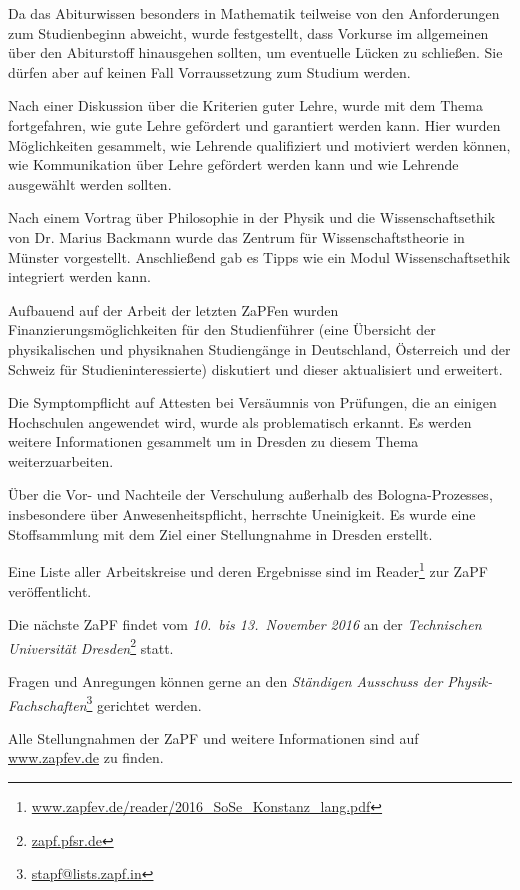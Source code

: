 Da das Abiturwissen besonders in Mathematik teilweise von den Anforderungen 
zum Studienbeginn abweicht, wurde festgestellt, dass Vorkurse im allgemeinen 
über den Abiturstoff hinausgehen sollten, um eventuelle Lücken zu schließen. 
Sie dürfen aber auf keinen Fall Vorraussetzung zum Studium werden.

Nach einer Diskussion über die Kriterien guter Lehre, wurde mit dem 
Thema fortgefahren, wie gute Lehre gefördert und garantiert werden kann. 
Hier wurden Möglichkeiten gesammelt, wie Lehrende qualifiziert und motiviert werden können, 
wie Kommunikation über Lehre gefördert werden kann und wie Lehrende ausgewählt werden sollten.

Nach einem Vortrag über Philosophie in der Physik und die Wissenschaftsethik von Dr. Marius
Backmann wurde das Zentrum für Wissenschaftstheorie in Münster
vorgestellt. Anschließend gab es Tipps wie ein Modul Wissenschaftsethik integriert werden kann.

Aufbauend auf der Arbeit der letzten ZaPFen wurden Finanzierungsmöglichkeiten für den 
Studienführer (eine Übersicht der physikalischen und physiknahen Studiengänge in 
Deutschland, Österreich und der Schweiz für Studieninteressierte) diskutiert und dieser aktualisiert und erweitert.

Die Symptompflicht auf Attesten bei Versäumnis von Prüfungen, die an einigen Hochschulen 
angewendet wird, wurde als problematisch erkannt. Es werden weitere Informationen gesammelt um in Dresden zu diesem Thema weiterzuarbeiten.

Über die Vor- und Nachteile der Verschulung außerhalb des Bologna-Prozesses, 
insbesondere über Anwesenheitspflicht, herrschte Uneinigkeit. 
Es wurde eine Stoffsammlung mit dem Ziel einer Stellungnahme in Dresden erstellt.

Eine Liste aller Arbeitskreise und deren Ergebnisse sind im
Reader\footnote{\href{http://www.zapfev.de/reader/2016_SoSe_Konstanz_lang.pdf}{\url{www.zapfev.de/reader/2016_SoSe_Konstanz_lang.pdf}}}
zur ZaPF veröffentlicht.

\vfill

Die nächste ZaPF findet vom \emph{10.\ bis 13.\ November 2016} an der  \emph{Technischen Universität Dresden}\footnote{\href{https://zapf.pfsr.de/}{\url{zapf.pfsr.de}}} statt.

Fragen und Anregungen können gerne an den \emph{Ständigen Ausschuss der Physik-Fachschaften}\footnote{\href{mailto:stapf@lists.zapf.in}{\url{stapf@lists.zapf.in}}} gerichtet werden.

Alle Stellungnahmen der ZaPF und weitere Informationen sind auf \href{http://www.zapfev.de}{\url{www.zapfev.de}} zu finden.

